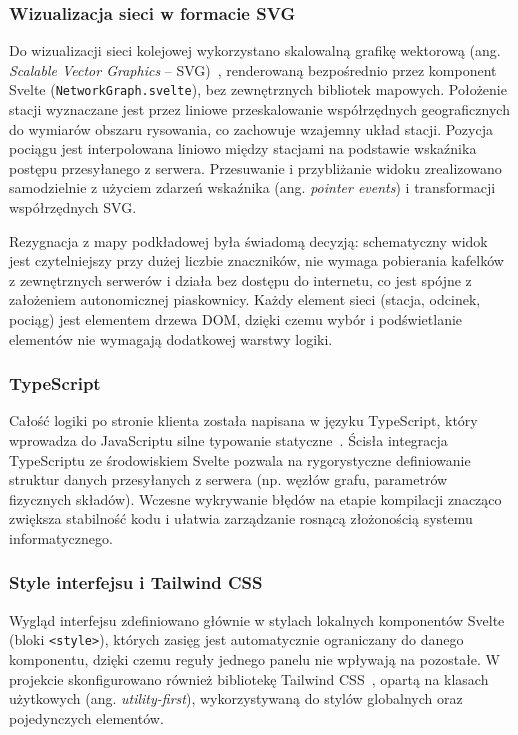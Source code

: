 \documentclass[twoside]{projektInzynierskiMS1z}
\begin{document}
\subsubsection{Wizualizacja sieci w formacie SVG}

Do wizualizacji sieci kolejowej wykorzystano skalowalną grafikę wektorową
(ang. \emph{Scalable Vector Graphics} -- SVG)~\cite{svg}, renderowaną
bezpośrednio przez komponent Svelte (\texttt{NetworkGraph.svelte}), bez
zewnętrznych bibliotek mapowych. Położenie stacji wyznaczane jest przez liniowe
przeskalowanie współrzędnych geograficznych do wymiarów obszaru rysowania, co
zachowuje wzajemny układ stacji. Pozycja pociągu jest interpolowana liniowo
między stacjami na podstawie wskaźnika postępu przesyłanego z serwera.
Przesuwanie i przybliżanie widoku zrealizowano samodzielnie z użyciem zdarzeń
wskaźnika (ang. \emph{pointer events}) i transformacji współrzędnych SVG.

Rezygnacja z mapy podkładowej była świadomą decyzją: schematyczny widok jest
czytelniejszy przy dużej liczbie znaczników, nie wymaga pobierania kafelków
z zewnętrznych serwerów i działa bez dostępu do internetu, co jest spójne
z założeniem autonomicznej piaskownicy. Każdy element sieci (stacja, odcinek,
pociąg) jest elementem drzewa DOM, dzięki czemu wybór i podświetlanie elementów
nie wymagają dodatkowej warstwy logiki.

\subsubsection{TypeScript}

Całość logiki po stronie klienta została napisana w języku TypeScript, który wprowadza
do JavaScriptu silne typowanie statyczne~\cite{typescript}. Ścisła integracja
TypeScriptu ze środowiskiem Svelte pozwala na rygorystyczne definiowanie struktur
danych przesyłanych z serwera (np. węzłów grafu, parametrów fizycznych składów).
Wczesne wykrywanie błędów na etapie kompilacji znacząco zwiększa stabilność kodu
i ułatwia zarządzanie rosnącą złożonością systemu informatycznego.

\subsubsection{Style interfejsu i Tailwind CSS}

Wygląd interfejsu zdefiniowano głównie w stylach lokalnych komponentów Svelte
(bloki \texttt{<style>}), których zasięg jest automatycznie ograniczany do
danego komponentu, dzięki czemu reguły jednego panelu nie wpływają na pozostałe.
W projekcie skonfigurowano również bibliotekę Tailwind CSS~\cite{tailwind},
opartą na klasach użytkowych (ang. \emph{utility-first}), wykorzystywaną do
stylów globalnych oraz pojedynczych elementów.
\end{document}
